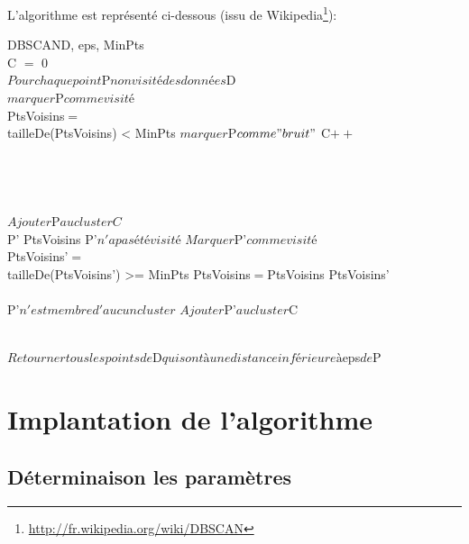 \documentclass{report}
\begin{document}
L'algorithme est représenté ci-dessous (issu de Wikipedia\footnote{\url{http://fr.wikipedia.org/wiki/DBSCAN}}):

\begin{pseudocode}{DBSCAN}{D, eps, MinPts}
\\
C $=$ 0\\
$Pour chaque point $P$ non visité des données $D\\
$marquer $P$ comme visité$\\
PtsVoisins$ = $\\
\IF tailleDe(PtsVoisins) < MinPts
\THEN $marquer $P$ comme "bruit"$
\ELSE 
	\BEGIN
		C$++$\\
		\\
	\END\\
\\

\\
	$Ajouter $P$ au cluster C$\\
	\FOREACH P' \in PtsVoisins \DO
			\IF P'$ n'a pas été visité$
			\THEN 
				\BEGIN
					$Marquer $P'$ comme visité$\\
					PtsVoisins'$ = $ \\
					\IF tailleDe(PtsVoisins') >= MinPts
					\THEN PtsVoisins$ = $PtsVoisins \cup PtsVoisins'\\
				\END\\
			\IF P'$ n'est membre d'aucun cluster$
			\THEN $Ajouter $P'$ au cluster $C
\ENDPROCEDURE

\\
	$Retourner tous les points de $D$ qui sont à une distance inférieure à $eps$ de $P
\ENDPROCEDURE
\end{pseudocode}

\section{Implantation de l'algorithme}

\subsection{Déterminaison les paramètres}
\end{document}

